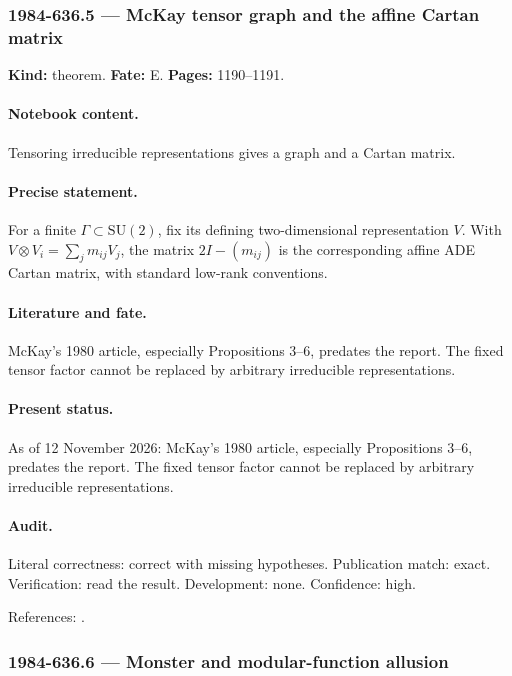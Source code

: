 \subsubsection{1984-636.5 --- McKay tensor graph and the affine Cartan matrix}

\label{item:1984-636.5}

\noindent\textbf{Kind:} theorem. \textbf{Fate:} E. \textbf{Pages:} 1190--1191.\par

\paragraph{Notebook content.} Tensoring irreducible representations gives a graph and a Cartan matrix.

\paragraph{Precise statement.} For a finite \(\Gamma\subset\mathrm{SU}(2)\), fix its defining two-dimensional representation \(V\). With \(V\otimes V_i=\sum_jm_{ij}V_j\), the matrix \(2I-(m_{ij})\) is the corresponding affine ADE Cartan matrix, with standard low-rank conventions.

\paragraph{Literature and fate.} McKay's 1980 article, especially Propositions 3--6, predates the report. The fixed tensor factor cannot be replaced by arbitrary irreducible representations.

\paragraph{Present status.} As of 12 November 2026: McKay's 1980 article, especially Propositions 3--6, predates the report. The fixed tensor factor cannot be replaced by arbitrary irreducible representations.

\paragraph{Audit.} Literal correctness: correct with missing hypotheses. Publication match: exact. Verification: read the result. Development: none. Confidence: high.

\noindent References: \citep{mckay1980graphs}.\par

\subsubsection{1984-636.6 --- Monster and modular-function allusion}

